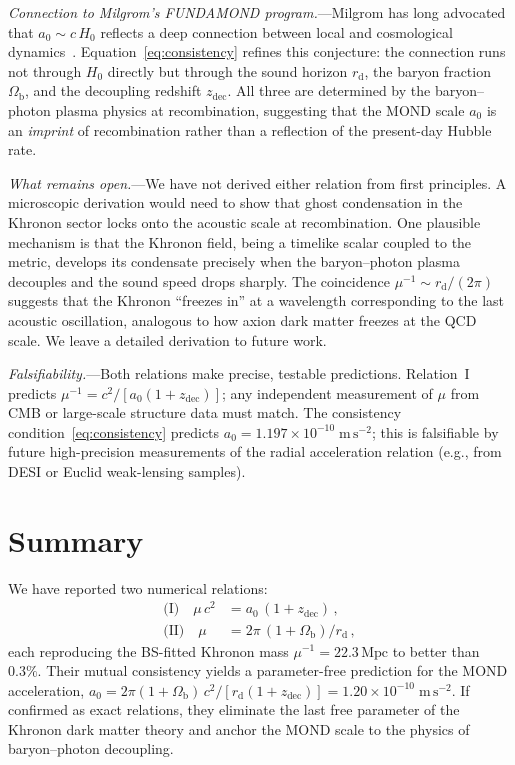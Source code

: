 \documentclass[prl,twocolumn,superscriptaddress,longbibliography]{revtex4-2}
\newcommand{\Mpc}{\,\mathrm{Mpc}}
\newcommand{\zdec}{z_{\mathrm{dec}}}
\newcommand{\rd}{r_{\mathrm{d}}}
\newcommand{\Ob}{\Omega_{\mathrm{b}}}
\begin{document}
\emph{Connection to Milgrom's FUNDAMOND
program.}---Milgrom has long
advocated that $a_0 \sim c\, H_0$ reflects a deep
connection between local and cosmological
dynamics~\cite{Milgrom1999,Milgrom2020}.
Equation~\eqref{eq:consistency} refines
this conjecture: the connection runs not through
$H_0$ directly but through the sound horizon $\rd$,
the baryon fraction $\Ob$, and the decoupling
redshift $\zdec$.
All three are determined by the baryon--photon
plasma physics at recombination, suggesting that the
MOND scale $a_0$ is an \emph{imprint} of
recombination rather than a reflection of the
present-day Hubble rate.

\emph{What remains open.}---We have not derived
either relation from first principles.
A microscopic derivation would need to show that
ghost condensation in the Khronon sector locks onto
the acoustic scale at recombination.
One plausible mechanism is that the Khronon field,
being a timelike scalar coupled to the metric,
develops its condensate precisely when the
baryon--photon plasma decouples and the sound
speed drops sharply.
The coincidence $\mu^{-1} \sim \rd / (2\pi)$
suggests that the Khronon ``freezes in'' at a
wavelength corresponding to the last acoustic
oscillation, analogous to how axion dark matter
freezes at the QCD scale.
We leave a detailed derivation to future work.

\emph{Falsifiability.}---Both relations make
precise, testable predictions.
Relation~I predicts $\mu^{-1} = c^2 / [a_0(1 + \zdec)]$;
any independent measurement of $\mu$ from CMB or
large-scale structure data must match.
The consistency condition~\eqref{eq:consistency}
predicts $a_0 = 1.197 \times 10^{-10}\;\mathrm{m\,s}^{-2}$;
this is falsifiable by future high-precision measurements
of the radial acceleration relation (e.g., from DESI
or Euclid weak-lensing samples).


\section{Summary}
\label{sec:summary}

We have reported two numerical relations:
\begin{align}
  \text{(I)}\quad \mu\,c^2 &= a_0\,(1+\zdec) \,,
  \label{eq:summary1} \\
  \text{(II)}\quad \mu &= 2\pi\,(1+\Ob)/\rd \,,
  \label{eq:summary2}
\end{align}
each reproducing the BS-fitted Khronon mass
$\mu^{-1} = 22.3\Mpc$ to better than $0.3\%$.
Their mutual consistency yields a parameter-free
prediction for the MOND acceleration,
$a_0 = 2\pi(1+\Ob)\,c^2 / [\rd(1+\zdec)]
= 1.20 \times 10^{-10}\;\mathrm{m\,s}^{-2}$.
If confirmed as exact relations, they eliminate the last
free parameter of the Khronon dark matter theory and
anchor the MOND scale to the physics of
baryon--photon decoupling.
\end{document}
